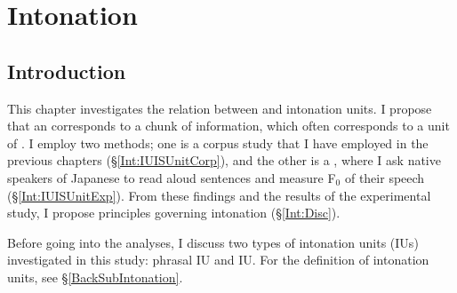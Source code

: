 \chapter{Intonation}\label{Intonation}



\section{Introduction}\label{Int:PIUCIU}

This chapter investigates the relation between  and intonation units.
I propose that
an  corresponds to a chunk of information, which often corresponds to a unit of .
I employ two methods;
one is a corpus study that I have employed in the previous chapters (\S \ref{Int:IUISUnitCorp}),
and the other is a , where I ask native speakers of Japanese to read aloud sentences and measure F$_{0}$ of their speech (\S \ref{Int:IUISUnitExp}).
From these findings and the results of the experimental study,
I propose principles governing intonation (\S \ref{Int:Disc}).


Before going into the analyses,
I discuss two types of intonation units (IUs) investigated in this study:
phrasal IU and  IU.
For the definition of intonation units,
see \S \ref{BackSubIntonation}.


